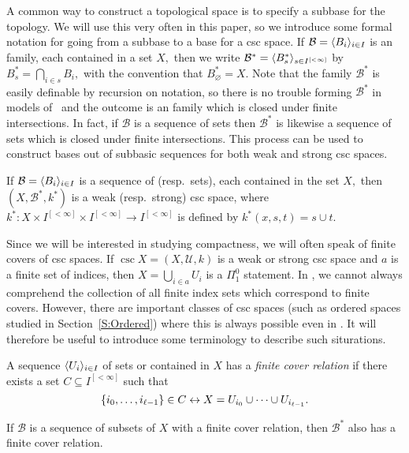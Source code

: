 \documentclass[csc]{subfiles}
\begin{document}
A common way to construct a topological space is to specify a subbase for the topology.
We will use this very often in this paper, so we introduce some formal notation for going from a subbase to a base for a csc space.
If \(\mathcal{B} = \langle B_i\rangle_{i \in I}\) is an \eset{} family, each contained in a set \(X,\) then we write \(\mathcal{B}^* = \langle B^*_s\rangle_{s \in I^{[<\infty]}}\) by \(B^*_s = \bigcap_{i \in s} B_i,\) with the convention that \(B^*_\varnothing = X.\)
Note that the family \(\mathcal{B}^*\) is easily definable by recursion on notation, so there is no trouble forming \(\mathcal{B}^*\) in models of \RCA\ and the outcome is an\eset{} family which is closed under finite intersections.
In fact, if \(\mathcal{B}\) is a sequence of sets then \(\mathcal{B}^*\) is likewise a sequence of sets which is closed under finite intersections.
This process can be used to construct bases out of subbasic sequences for both weak and strong csc spaces.

\begin{proposition}[\RCA]\label{P:Subbase}
  If \(\mathcal{B} = \langle B_i\rangle_{i \in I}\) is a sequence of  \textup(resp.\ sets\textup), each contained in the set \(X,\) then \((X,\mathcal{B}^*,k^*)\) is a weak \textup(resp.\ strong\textup) csc space, where \(k^*:X \times I^{[<\infty]} \times I^{[<\infty]} \to I^{[<\infty]}\) is defined by \(k^*(x,s,t) = s \cup t.\)
\end{proposition}

Since we will be interested in studying compactness, we will often speak of finite covers of csc spaces.
If \(\csc{X}=(X,\mathcal{U},k)\) is a weak or strong csc space and \(a\) is a finite set of indices, then \(X = \bigcup_{i \in a} U_i\) is a \(\Pi^0_1\) statement.
In \RCA, we cannot always comprehend the collection of all finite index sets which correspond to finite covers.
However, there are important classes of csc spaces (such as ordered spaces studied in Section~\ref{S:Ordered}) where this is always possible even in \RCA.
It will therefore be useful to introduce some terminology to describe such siturations.

\begin{definition}[\RCA]
  A sequence \(\langle U_i\rangle_{i \in I}\) of sets or  contained in \(X\) has a \emph{finite cover relation} if there exists a set \(C \subseteq I^{[<\infty]}\) such that \[\lbrace i_0,\dots,i_{\ell-1}\rbrace \in C \leftrightarrow X = U_{i_0} \cup\cdots\cup U_{i_{\ell-1}}.\]
\end{definition}

\begin{lemma}[\RCA]\label{L:SubFiniteCover}
  If \(\mathcal{B}\) is a sequence of subsets of \(X\) with a finite cover relation, then \(\mathcal{B}^*\) also has a finite cover relation.
\end{lemma}
\end{document}
